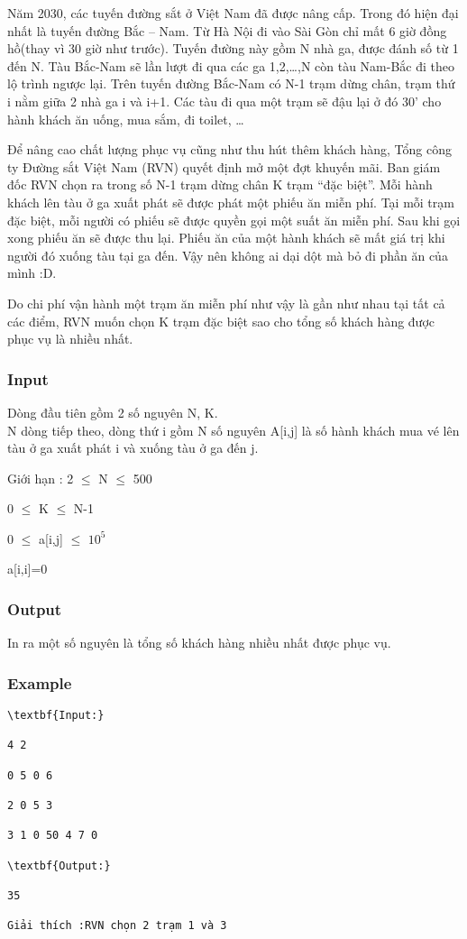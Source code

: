 



   Năm 2030, các tuyến đường sắt ở Việt Nam đã được nâng cấp. Trong đó hiện đại nhất là tuyến đường Bắc – Nam. Từ Hà Nội đi vào Sài Gòn chỉ mất 6 giờ đồng hồ(thay vì 30 giờ như trước). Tuyến đường này gồm N nhà ga, được đánh số từ 1 đến N. Tàu Bắc-Nam sẽ lần lượt đi qua các ga 1,2,…,N còn tàu Nam-Bắc đi theo lộ trình ngược lại. Trên tuyến đường Bắc-Nam có N-1 trạm dừng chân, trạm thứ i nằm giữa 2 nhà ga i và i+1. Các tàu đi qua một trạm sẽ đậu lại ở đó 30’ cho hành khách ăn uống, mua sắm, đi toilet, …  

   Để nâng cao chất lượng phục vụ cũng như thu hút thêm khách hàng, Tổng công ty Đường sắt Việt Nam (RVN) quyết định mở một đợt khuyến mãi. Ban giám đốc RVN chọn ra trong số N-1 trạm dừng chân K trạm “đặc biệt”. Mỗi hành khách lên tàu ở ga xuất phát sẽ được phát một phiếu ăn miễn phí. Tại mỗi trạm đặc biệt, mỗi người có phiếu sẽ được quyền gọi một suất ăn miễn phí. Sau khi gọi xong phiếu ăn sẽ được thu lại. Phiếu ăn của một hành khách sẽ mất giá trị khi người đó xuống tàu tại ga đến. Vậy nên không ai dại dột mà bỏ đi phần ăn của mình :D.  

   Do chi phí vận hành một trạm ăn miễn phí như vậy là gần như nhau tại tất cả các điểm, RVN muốn chọn K trạm đặc biệt sao cho tổng số khách hàng được phục vụ là nhiều nhất.  

\subsubsection{   Input  }

   Dòng đầu tiên gồm 2 số nguyên N, K.   
\\   N dòng tiếp theo, dòng thứ i gồm N số nguyên A[i,j] là số hành khách mua vé lên tàu ở ga xuất phát i và xuống tàu ở ga đến j.  

    Giới hạn :      2  $\le$  N  $\le$  500  

   0  $\le$  K  $\le$  N-1  

   0  $\le$  a[i,j]  $\le$  $10^{5}$

   a[i,i]=0  

\subsubsection{   Output  }

   In ra một số nguyên là tổng số khách hàng nhiều nhất được phục vụ.  

\subsubsection{   Example  }
\begin{verbatim}
\textbf{Input:}

4 2

0 5 0 6

2 0 5 3

3 1 0 50 4 7 0

\textbf{Output:}

35

Giải thích :RVN chọn 2 trạm 1 và 3\end{verbatim}
